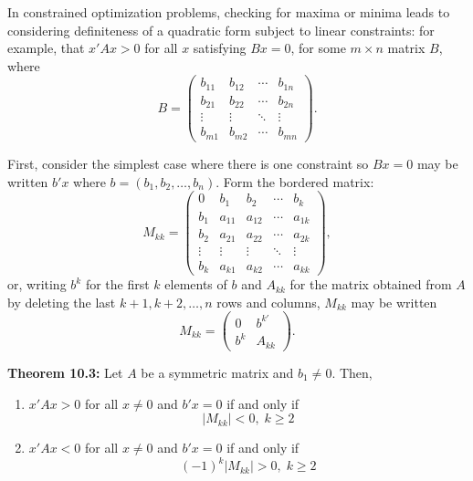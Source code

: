 \begin{original}
In constrained optimization problems, checking for maxima or minima leads to considering definiteness of a quadratic form subject to linear constraints: for example, that $x'Ax > 0$ for all $x$ satisfying $Bx = 0$, for some $m \times n$ matrix $B$, where
\[
B = \begin{pmatrix}
b_{11} & b_{12} & \cdots & b_{1n} \\
b_{21} & b_{22} & \cdots & b_{2n} \\
\vdots & \vdots & \ddots & \vdots \\
b_{m1} & b_{m2} & \cdots & b_{mn}
\end{pmatrix}.
\]

First, consider the simplest case where there is one constraint so $Bx = 0$ may be written $b'x$ where $b = (b_1, b_2, \ldots, b_n)$. Form the bordered matrix:
\[
M_{kk} = \begin{pmatrix}
0 & b_1 & b_2 & \cdots & b_k \\
b_1 & a_{11} & a_{12} & \cdots & a_{1k} \\
b_2 & a_{21} & a_{22} & \cdots & a_{2k} \\
\vdots & \vdots & \vdots & \ddots & \vdots \\
b_k & a_{k1} & a_{k2} & \cdots & a_{kk}
\end{pmatrix},
\]
or, writing $b^k$ for the first $k$ elements of $b$ and $A_{kk}$ for the matrix obtained from $A$ by deleting the last $k+1, k+2, \ldots, n$ rows and columns, $M_{kk}$ may be written
\[
M_{kk} = \begin{pmatrix} 0 & b^{k'} \\ b^k & A_{kk} \end{pmatrix}.
\]

\textbf{Theorem 10.3:} Let $A$ be a symmetric matrix and $b_1 \neq 0$. Then,
\begin{enumerate}
\item $x'Ax > 0$ for all $x \neq 0$ and $b'x = 0$ if and only if
\[
|M_{kk}| < 0,\; k \geq 2
\]
\item $x'Ax < 0$ for all $x \neq 0$ and $b'x = 0$ if and only if
\[
(-1)^k|M_{kk}| > 0,\; k \geq 2
\]
\end{enumerate}
\end{original}
